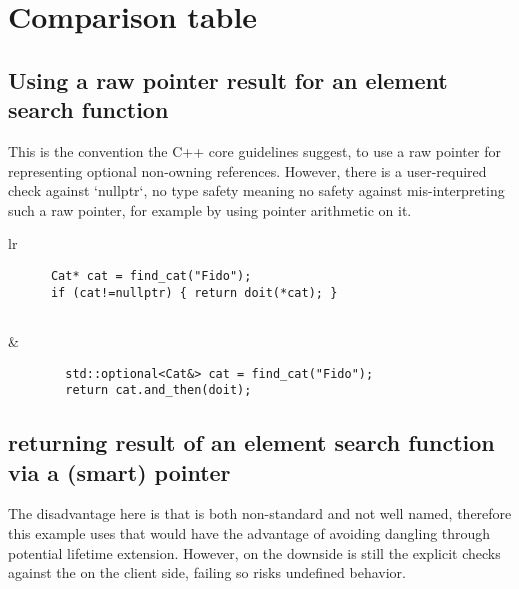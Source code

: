 \documentclass[a4paper,10pt,oneside,openany,final,article]{memoir}
\begin{document}
\chapter{Comparison table}
\section{Using a raw pointer result for an element search function}

This is the convention the C++ core guidelines suggest, to use a raw pointer for representing optional non-owning references.
However, there is a user-required check against `nullptr`, no type safety meaning no safety against mis-interpreting such a raw pointer, for example by using pointer arithmetic on it.

\begin{tabular}{ lr }
  \begin{minipage}[t]{0.45\columnwidth}
    \begin{verbatim}
      Cat* cat = find_cat("Fido");
      if (cat!=nullptr) { return doit(*cat); }


    \end{verbatim}
  \end{minipage}
  &
    \begin{minipage}[t]{0.45\columnwidth}
      \begin{verbatim}
        std::optional<Cat&> cat = find_cat("Fido");
        return cat.and_then(doit);

      \end{verbatim}
    \end{minipage}
\end{tabular}

\section{returning result of an element search function via a (smart) pointer}

The disadvantage here is that  is both non-standard and not well named, therefore this example uses  that would have the advantage of avoiding dangling through potential lifetime extension.
However, on the downside is still the explicit checks against the  on the client side, failing so risks undefined behavior.
\end{document}
